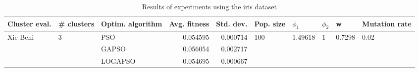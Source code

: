 \begin{table}
\centering
\caption{Results of experiments using the iris dataset}
\begin{tabular}{lllrrlllll}
\toprule
            Cluster eval. &        \# clusters & Optim. algorithm &  Avg. fitness &  Std. dev. &            Pop. size &               $\phi_{1}$ &         $\phi_{2}$ &                       w &         Mutation rate \\
\midrule
\multirow{3}{*}{Xie Beni} & \multirow{3}{*}{3} &              PSO &      0.054595 &   0.000714 & \multirow{3}{*}{100} & \multirow{3}{*}{1.49618} & \multirow{3}{*}{1} & \multirow{3}{*}{0.7298} & \multirow{3}{*}{0.02} \\
                          &                    &            GAPSO &      0.056054 &   0.002717 &                      &                          &                    &                         &                       \\
                          &                    &          LOGAPSO &      0.054695 &   0.000667 &                      &                          &                    &                         &                       \\
\bottomrule
\end{tabular}
\end{table}
